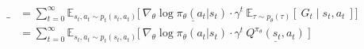 \begin{align}
\_
&= \sum_{t=0}^{\infty} \mathbb{E}_{s_t,a_t \sim p_t(s_t,a_t)} \Big\lbrack\ \underline{\nabla_\theta\log \pi_\theta(a_t|s_t)\cdot \gamma^t} \ \mathbb{E}_{\tau \sim p_\theta(\tau)} \left\lbrack\ G_t \mid {s_t, a_t} \ \right\rbrack \Big\rbrack \\
&= \sum_{t=0}^{\infty} \mathbb{E}_{s_t,a_t \sim p_t(s_t,a_t)} \Big\lbrack\ \nabla_\theta\log \pi_\theta(a_t|s_t)\cdot \gamma^t \ \underline{Q^{\pi_\theta}(s_t, a_t)} \ \Big\rbrack
\end{align}